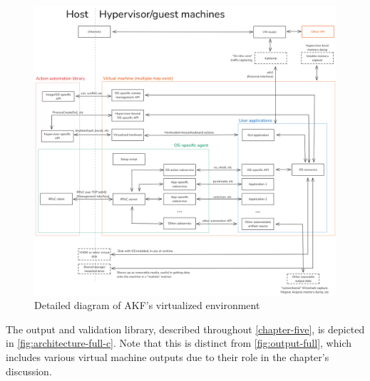 \documentclass[letterpaper,12pt]{report}
\begin{document}
\begin{figure}[h]
\centering
\includegraphics[width=1\linewidth]{architecture-full-d.png}
\caption{Detailed diagram of AKF's virtualized
environment}\label{fig:architecture-full-d}
\end{figure}

The output and validation library, described throughout \autoref{chapter-five}, is depicted in
\autoref{fig:architecture-full-c}. Note that this is distinct from
\autoref{fig:output-full}, which includes various virtual machine
outputs due to their role in the chapter's discussion.
\end{document}
